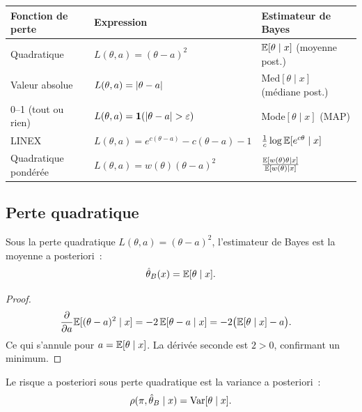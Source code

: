 \begin{formules}[title=\textbf{Estimateurs de Bayes selon la perte}]
\begin{center}
\renewcommand{\arraystretch}{1.5}
\begin{tabular}{p{4.5cm} p{4cm} p{5cm}}
\toprule
\textbf{Fonction de perte} & \textbf{Expression} & \textbf{Estimateur de Bayes} \\
\midrule
Quadratique & $L(\theta, a) = (\theta - a)^2$ &
  $\mathbb{E}[\theta \mid x]$ (moyenne post.) \\
Valeur absolue & $L(\theta, a) = \left| \theta - a \right|$ &
  $\text{Med}[\theta \mid x]$ (m\'ediane post.) \\
0--1 (tout ou rien) & $L(\theta, a) = \mathbf{1}(\left| \theta - a \right| > \varepsilon)$ &
  Mode$[\theta \mid x]$ (MAP) \\
LINEX & $L(\theta, a) = e^{c(\theta-a)} - c(\theta-a) - 1$ &
  $\frac{1}{c}\log \mathbb{E}[e^{c\theta} \mid x]$ \\
Quadratique pond\'er\'ee & $L(\theta, a) = w(\theta)(\theta - a)^2$ &
  $\frac{\mathbb{E}[w(\theta)\theta \mid x]}{\mathbb{E}[w(\theta) \mid x]}$ \\
\bottomrule
\end{tabular}
\end{center}
\end{formules}

\subsection{Perte quadratique}

\begin{theoreme}
\label{thm:bayes_quad}
Sous la perte quadratique $L(\theta, a) = (\theta - a)^2$,
l'estimateur de Bayes est la moyenne a posteriori~:
\[
  \hat{\theta}_B(x) = \mathbb{E}[\theta \mid x].
\]
\end{theoreme}

\begin{proof}
\begin{align*}
  \frac{\partial}{\partial a} \mathbb{E}[(\theta - a)^2 \mid x]
  &= -2\,\mathbb{E}[\theta - a \mid x]
  = -2\big(\mathbb{E}[\theta \mid x] - a\big).
\end{align*}
Ce qui s'annule pour $a = \mathbb{E}[\theta \mid x]$. La d\'eriv\'ee seconde
est $2 > 0$, confirmant un minimum.
\end{proof}

\begin{corollaire}
Le risque a posteriori sous perte quadratique est la variance a
posteriori~:
\[
  \rho(\pi, \hat{\theta}_B \mid x) = \mathrm{Var}[\theta \mid x].
\]
\end{corollaire}

